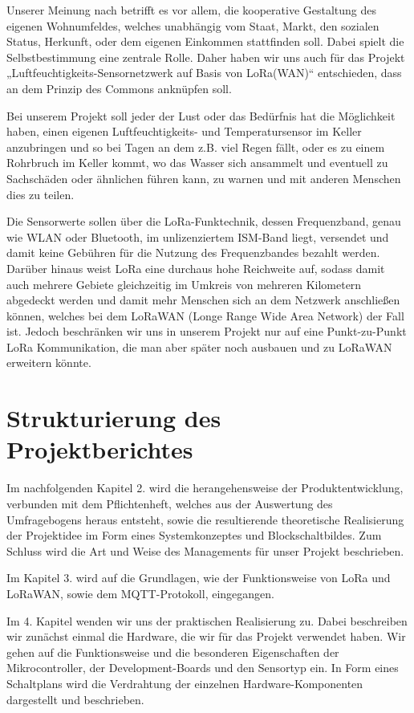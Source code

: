 Unserer Meinung nach betrifft es vor allem, die kooperative Gestaltung des eigenen Wohnumfeldes, welches unabhängig vom Staat, Markt, den sozialen Status, Herkunft, oder dem eigenen Einkommen stattfinden soll. Dabei spielt die Selbstbestimmung eine zentrale Rolle. Daher haben wir uns auch für das Projekt „Luftfeuchtigkeits-Sensornetzwerk auf Basis von LoRa(WAN)“ entschieden, dass an dem Prinzip des Commons anknüpfen soll.  

Bei unserem Projekt soll jeder der Lust oder das Bedürfnis hat die Möglichkeit haben, einen eigenen Luftfeuchtigkeits- und Temperatursensor im Keller anzubringen und so bei Tagen an dem z.B. viel Regen fällt, oder es zu einem Rohrbruch im Keller kommt, wo das Wasser sich ansammelt und eventuell zu Sachschäden oder ähnlichen führen kann, zu warnen und mit anderen Menschen dies zu teilen.  

Die Sensorwerte sollen über die LoRa-Funktechnik, dessen Frequenzband, genau wie WLAN oder Bluetooth, im unlizenziertem ISM-Band liegt, versendet und damit keine Gebühren für die Nutzung des Frequenzbandes bezahlt werden. Darüber hinaus weist LoRa eine durchaus hohe Reichweite auf, sodass damit auch mehrere Gebiete gleichzeitig im Umkreis von mehreren Kilometern abgedeckt werden und damit mehr Menschen sich an dem Netzwerk anschließen können, welches bei dem LoRaWAN (Longe Range Wide Area Network) der Fall ist. Jedoch beschränken wir uns in unserem Projekt nur auf eine Punkt-zu-Punkt LoRa Kommunikation, die man aber später noch ausbauen und zu LoRaWAN erweitern könnte.  

\section{Strukturierung des Projektberichtes} \label{Strukturierung des Projektberichtes}

Im nachfolgenden Kapitel 2. wird die herangehensweise der Produktentwicklung, verbunden mit dem Pflichtenheft, welches aus der Auswertung des Umfragebogens heraus entsteht, sowie die resultierende theoretische Realisierung der Projektidee im Form eines Systemkonzeptes und Blockschaltbildes. Zum Schluss wird die Art und Weise des Managements für unser Projekt beschrieben. 

Im Kapitel 3. wird auf die Grundlagen, wie der Funktionsweise von LoRa und LoRaWAN, sowie dem MQTT-Protokoll, eingegangen.  

Im 4. Kapitel wenden wir uns der praktischen Realisierung zu. Dabei beschreiben wir zunächst einmal die Hardware, die wir für das Projekt verwendet haben. Wir gehen auf die Funktionsweise und die besonderen Eigenschaften der Mikrocontroller, der Development-Boards und den Sensortyp ein. In Form eines Schaltplans wird die Verdrahtung der einzelnen Hardware-Komponenten dargestellt und beschrieben.

